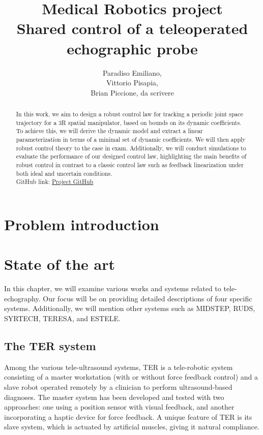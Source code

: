 \documentclass{article}
\author{Paradiso Emiliano,  \quad 1940454 \\Vittorio Pisapia,  \quad 1918590 \\Brian Piccione, \quad da scrivere}
\title{\Huge Medical Robotics project \\ \centering \Large \textbf{Shared control of a teleoperated echographic probe}}
\begin{document}
\maketitle
\vspace{2cm}

\begin{abstract}
\hspace*{-0.5cm}In this work, we aim to design a robust control law for tracking a periodic joint space trajectory for a 3R spatial manipulator, based on bounds on its dynamic coefficients. To achieve this, we will derive the dynamic model and extract a linear parameterization in terms of a minimal set of dynamic coefficients. We will then apply robust control theory to the case in exam. Additionally, we will conduct simulations to evaluate the performance of our designed control law, highlighting the main benefits of robust control in contrast to a classic control law such as feedback linearization under both ideal and uncertain conditions.
\\GitHub link: \uline{\href{https://github.com/VittorioPisapia/Medical-Robotics/tree/main}{Project GitHub}}
\end{abstract}

\newpage
\tableofcontents
\newpage

\section{Problem introduction}

\section{State of the art}
In this chapter, we will examine various works and systems related to tele-echography. Our focus will be on providing detailed descriptions of four specific systems. Additionally, we will mention other systems such as MIDSTEP, RUDS, SYRTECH, TERESA, and ESTELE.

\subsection{The TER system}
Among the various tele-ultrasound systems, TER is a tele-robotic system consisting of a master workstation (with or without force feedback control) and a slave robot operated remotely by a clinician to perform ultrasound-based diagnoses. The master system has been developed and tested with two approaches: one using a position sensor with visual feedback, and another incorporating a haptic device for force feedback. A unique feature of TER is its slave system, which is actuated by artificial muscles, giving it natural compliance.
\end{document}
